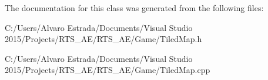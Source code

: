 The documentation for this class was generated from the following files\+:\begin{DoxyCompactItemize}
\item 
C\+:/\+Users/\+Alvaro Estrada/\+Documents/\+Visual Studio 2015/\+Projects/\+R\+T\+S\+\_\+\+A\+E/\+R\+T\+S\+\_\+\+A\+E/\+Game/Tiled\+Map.\+h\item 
C\+:/\+Users/\+Alvaro Estrada/\+Documents/\+Visual Studio 2015/\+Projects/\+R\+T\+S\+\_\+\+A\+E/\+R\+T\+S\+\_\+\+A\+E/\+Game/Tiled\+Map.\+cpp\end{DoxyCompactItemize}
